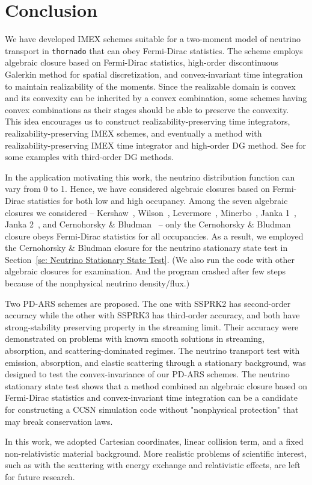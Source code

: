\section{Conclusion}\label{se:Conclusion}

We have developed IMEX schemes suitable for a two-moment model of neutrino transport in \texttt{thornado} that can obey Fermi-Dirac statistics.
The scheme employs algebraic closure based on Fermi-Dirac statistics, high-order discontinuous Galerkin method for spatial discretization, and convex-invariant time integration to maintain realizability of the moments.  
Since the realizable domain is convex and its convexity can be inherited by a convex combination, some schemes having convex combinations as their stages should be able to preserve the convexity.
This idea encourages us to construct realizability-preserving time integrators, realizability-preserving IMEX schemes, and eventually a method with realizability-preserving IMEX time integrator and high-order DG method.
See \cite{chu_etal_2018} for some examples with third-order DG methods.  

In the application motivating this work, the neutrino distribution function can vary from 0 to 1.  
Hence, we have considered algebraic closures based on Fermi-Dirac statistics for both low and high occupancy.  
Among the seven algebraic closures we considered -- Kershaw~\cite{kershaw_1976}, Wilson~\cite{wilson_1975,leblancWilson_1970}, Levermore~\cite{levermore_1984}, Minerbo~\cite{minerbo_1978}, Janka 1~\cite{janka_1991}, Janka 2~\cite{janka_1992}, and Cernohorsky \& Bludman~\cite{cernohorskyBludman_1994} -- only the Cernohorsky \& Bludman closure obeys Fermi-Dirac statistics for all occupancies.  
As a result, we employed the Cernohorsky \& Bludman closure for the neutrino stationary state test in Section~\ref{se: Neutrino Stationary State Test}.
(We also run the code with other algebraic closures for examination.
And the program crashed after few steps because of the nonphysical neutrino density/flux.)

Two PD-ARS schemes are proposed.
The one with SSPRK2 has second-order accuracy while the other with SSPRK3 has third-order accuracy, and both have strong-stability preserving property in the streaming limit.  
Their accuracy were demonstrated on problems with known smooth solutions in streaming, absorption, and scattering-dominated regimes.
The neutrino transport test with emission, absorption, and elastic scattering through a stationary background, was designed to test the convex-invariance of our PD-ARS schemes. 
The neutrino stationary state test shows that a method combined an algebraic closure based on Fermi-Dirac statistics and convex-invariant time integration can be a candidate for constructing a CCSN simulation code without "nonphysical protection" that may break conservation laws.

In this work, we adopted Cartesian coordinates, linear collision term, and a fixed non-relativistic material background.
More realistic problems of scientific interest, such as with the scattering with energy exchange and relativistic effects, are left for future research.